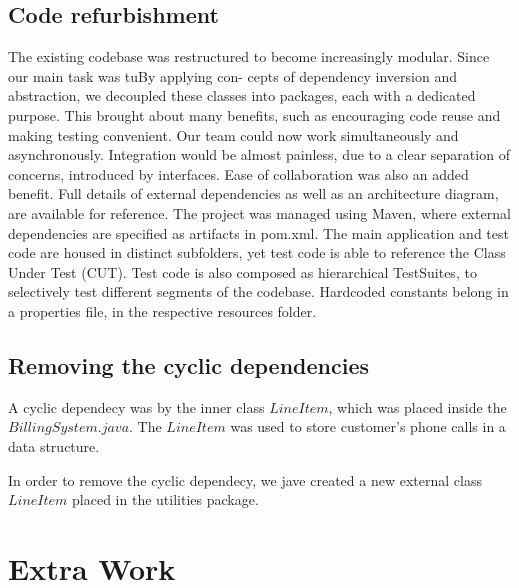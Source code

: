 \documentclass[11pt,twocolumn]{article} %
\begin{document}
\subsection{Code refurbishment}
The existing codebase was restructured to become increasingly modular. Since our main task was tuBy applying con-
cepts of dependency inversion and abstraction, we decoupled these classes into packages,
each with a dedicated purpose.
This brought about many benefits, such as encouraging code reuse and making testing
convenient. Our team could now work simultaneously and asynchronously. Integration
would be almost painless, due to a clear separation of concerns, introduced by interfaces.
Ease of collaboration was also an added benefit.
Full details of external dependencies as well as an architecture diagram, are available for reference.
The project was managed using Maven, where external dependencies are specified as
artifacts in pom.xml. The main application and test code are housed in distinct subfolders,
yet test code is able to reference the Class Under Test (CUT). Test code is also composed
as hierarchical TestSuites, to selectively test different segments of the codebase. Hardcoded
constants belong in a properties file, in the respective resources folder.

\subsection{Removing the cyclic dependencies}
A cyclic dependecy was by the inner class $LineItem$, which was placed inside the $BillingSystem.java$.
The $LineItem$ was used to store customer's phone calls in a data structure.

In order to remove the cyclic dependecy, we jave created a new external class $LineItem$ placed in the 
utilities package.

\section{Extra Work}
\end{document}

